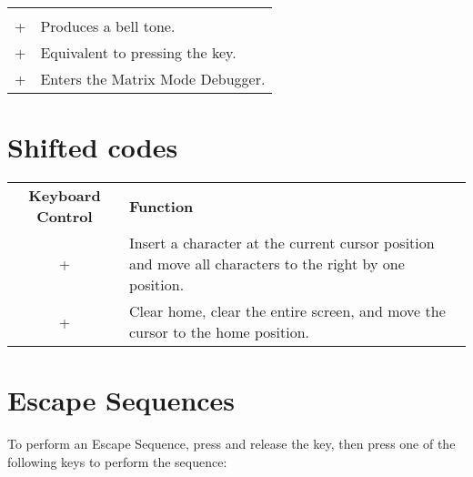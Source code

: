 \begin{center}
\begin{longtable}{c|L{5.5cm}}
  \hhline{==}
   \\
  \hhline{==}

 +  &
Produces a bell tone.\\
\hline
{} + \megakey{[} &
Equivalent to pressing the  key.\\
\hline
{} + \megakey{*} &
Enters the Matrix Mode Debugger.\\
\hline

\end{longtable}
\end{center}


\section{Shifted codes}
\label{appendix:shiftedcodes}

\begin{center}
\begin{longtable}{c|L{5.5cm}}
	\textbf{Keyboard Control} & \textbf{Function}\\
  \hhline{==}
	\endhead

 +  &
Insert a character at the current cursor position and move all characters to the right by one position.\\
\hline
{} +  &
Clear home, clear the entire screen, and move the cursor to the home position.\\
\hline

\end{longtable}
\end{center}



\section{Escape Sequences}
\label{appendix:escapesequences}

To perform an Escape Sequence, press and release the  key, then press one of the following keys to perform
the sequence:

